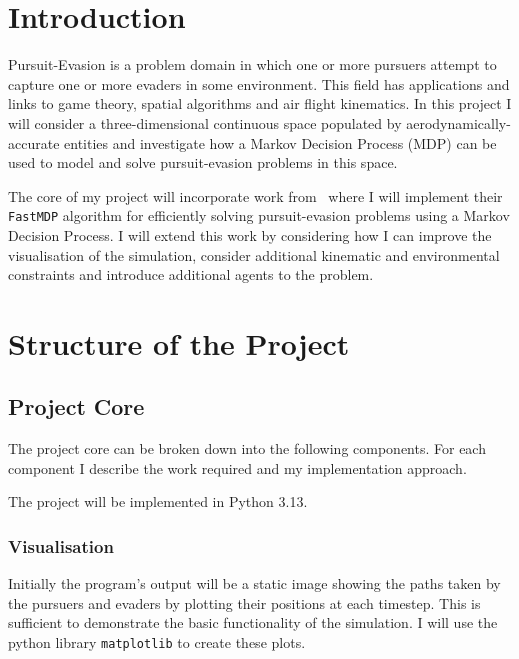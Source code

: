 \label{sec:D}

\begin{refsection}
  \section{Introduction}

  Pursuit-Evasion is a problem domain in which one or more pursuers attempt to capture one or more evaders in some environment. This field has applications and links to game theory, spatial algorithms and air flight kinematics. In this project I will consider a three-dimensional continuous space populated by aerodynamically-accurate entities and investigate how a Markov Decision Process (MDP) can be used to model and solve pursuit-evasion problems in this space.

  The core of my project will incorporate work from~\cite{bertram3d} where I will implement their \texttt{FastMDP} algorithm for efficiently solving pursuit-evasion problems using a Markov Decision Process. I will extend this work by considering how I can improve the visualisation of the simulation, consider additional kinematic and environmental constraints and introduce additional agents to the problem.

  \section{Structure of the Project}

  \subsection*{Project Core}

  The project core can be broken down into the following components. For each component I describe the work required and my implementation approach.

  The project will be implemented in Python 3.13.

  \subsubsection*{Visualisation}

  Initially the program's output will be a static image showing the paths taken by the pursuers and evaders by plotting their positions at each timestep. This is sufficient to demonstrate the basic functionality of the simulation. I will use the python library \texttt{matplotlib} to create these plots.


\end{refsection}
